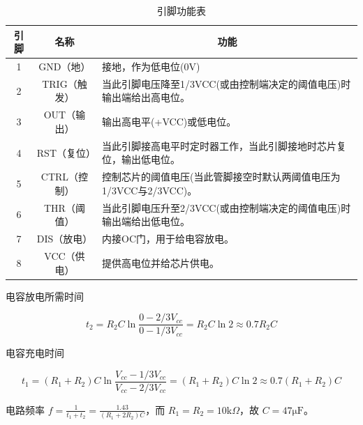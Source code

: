 \begin{table}[hbtp]
	\setlength{\abovecaptionskip}{0cm} 
	\setlength{\belowcaptionskip}{-0.2cm}
	\begin{center}
	\caption{引脚功能表}
	\begin{tabular}{|c|c|p{10cm}|}
		\hline
		\textbf{引脚} & \textbf{名称} & \multicolumn{1}{c|}{\textbf{功能}}                              \\ \hline
		1           & GND（地）      & 接地，作为低电位(0V)                             \\ \hline
		2           & TRIG（触发）    & 当此引脚电压降至1/3VCC(或由控制端决定的阈值电压)时输出端给出高电位。   \\ \hline
		3           & OUT（输出）     & {\color[HTML]{000000} 输出高电平(+VCC)或低电位。}  \\ \hline
		4           & RST（复位）     & 当此引脚接高电平时定时器工作，当此引脚接地时芯片复位，输出低电位。        \\ \hline
		5           & CTRL（控制）    & 控制芯片的阈值电压(当此管脚接空时默认两阈值电压为1/3VCC与2/3VCC)。 \\ \hline
		6           & THR（阈值）     & 当此引脚电压升至2/3VCC(或由控制端决定的阈值电压)时输出端给出低电位。   \\ \hline
		7           & DIS（放电）     & 内接OC门，用于给电容放电。                           \\ \hline
		8           & VCC（供电）     & 提供高电位并给芯片供电。                             \\ \hline
	\end{tabular}\label{LM555}
	\end{center}
\end{table}


电容放电所需时间

\begin{equation}
t_2=R_2C\ln \frac{0-2/3V_{cc}}{0-1/3V_{cc}}=R_2C\ln 2\approx 0.7R_2C
\end{equation}

电容充电时间

\begin{equation}
t_1=\left( R_1+R_2 \right) C\ln \frac{V_{cc}-1/3V_{cc}}{V_{cc}-2/3V_{cc}}=\left( R_1+R_2 \right) C\ln 2\approx 0.7\left( R_1+R_2 \right) C
\end{equation}

电路频率 $f=\frac{1}{t_1+t_2}=\frac{1.43}{\left( R_1+2R_2 \right) C}$，而 $R_1=R_2=10\mathrm{k}\Omega $，故 $C=47\mathrm{\mu F}$。


